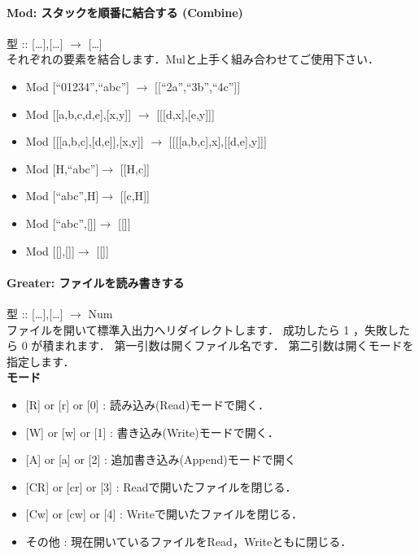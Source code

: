 \paragraph{Mod: スタックを順番に結合する (Combine)}

型 :: {[}\ldots{}{]},{[}\ldots{}{]} $\to$
{[}\ldots{}{]}\\それぞれの要素を結合します．Mulと上手く組み合わせてご使用下さい．

\begin{itemize}
\item
  Mod {[}``01234'',``abc''{]} $\to$
  {[}{[}``2a'',``3b'',``4c''{]}{]}
\item
  Mod {[}{[}a,b,c,d,e{]},{[}x,y{]}{]} $\to$
  {[}{[}{[}d,x{]},{[}e,y{]}{]}{]}
\item
  Mod {[}{[}{[}a,b,c{]},{[}d,e{]}{]},{[}x,y{]}{]} $\to$
  {[}{[}{[}{[}a,b,c{]},x{]},{[}{[}d,e{]},y{]}{]}{]}
\item
  Mod {[}H,``abc''{]}$\to$ {[}{[}H,c{]}{]}
\item
  Mod {[}``abc'',H{]}$\to$ {[}{[}c,H{]}{]}
\item
  Mod {[}``abc'',{[}{]}{]}$\to$ {[}{[}{]}{]}
\item
  Mod {[}{[}{]},{[}{]}{]}$\to$ {[}{[}{]}{]}
\end{itemize}

\paragraph{Greater: ファイルを読み書きする}

型 :: {[}\ldots{}{]},{[}\ldots{}{]} $\to$
Num\\ファイルを開いて標準入出力へリダイレクトします． 成功したら 1
，失敗したら 0 が積まれます． 第一引数は開くファイル名です．
第二引数は開くモードを指定します．\\\textbf{モード}

\begin{itemize}
\item
  {[}R{]} or {[}r{]} or {[}0{]} : 読み込み(Read)モードで開く．
\item
  {[}W{]} or {[}w{]} or {[}1{]} : 書き込み(Write)モードで開く．
\item
  {[}A{]} or {[}a{]} or {[}2{]} : 追加書き込み(Append)モードで開く
\item
  {[}CR{]} or {[}cr{]} or {[}3{]} : Readで開いたファイルを閉じる．
\item
  {[}Cw{]} or {[}cw{]} or {[}4{]} : Writeで開いたファイルを閉じる．
\item
  その他 : 現在開いているファイルをRead，Writeともに閉じる．
\end{itemize}

